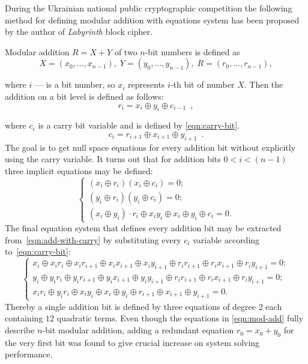 During the Ukrainian national public cryptographic competition the following
method for defining modular addition with equations system has been proposed 
by the author of \textit{Labyrinth} block cipher.

Modular addition $R = X + Y$ of two $n$-bit numbers is defined as 
\begin{equation}
\label{eqn:add}
X = (x_0, \hdots, x_{n-1}), \; 
Y = (y_0, \hdots, y_{n-1}), \;
R = (r_0, \hdots, r_{n-1}),
\end{equation}

where $i$ --- is a bit number, so $x_i$ represents $i$-th bit of number $X$. 
Then the addition on a bit level is defined as follows:
\begin{equation}
\label{eqn:trivial-mod-add}
r_i = x_i \oplus y_i \oplus c_{i-1} \enspace,
\end{equation}

where $c_i$ is a carry bit variable and is defined by \eqref{eqn:carry-bit}.
\begin{equation}
\label{eqn:carry-bit}
c_i = r_{i+1} \oplus x_{i+1} \oplus y_{i+1} \enspace.
\end{equation}
The goal is to get null space equations for every addition bit without
explicitly using the carry variable. It turns out that for addition bits 
$0 < i < (n - 1)$ three implicit equations may be defined:
\begin{equation}
\label{eqn:add-with-carry}
\left\{
	\begin{array}{ll}
        (x_i \oplus r_i) (x_i \oplus c_i) = 0; \\
        (y_i \oplus r_i) (y_i \oplus c_i) = 0; \\
        (x_i \oplus y_i) \cdot r_i \oplus x_i y_i \oplus x_i \oplus y_i \oplus c_i = 0.
	\end{array} \right.
\end{equation}
The final equation system that defines every addition bit may be extracted
from~\eqref{eqn:add-with-carry} by substituting every $c_i$ variable according
to~\ref{eqn:carry-bit}:
\begin{equation}
\label{eqn:mod-add}
\left\{
	\begin{array}{ll}
        x_i \oplus x_i r_i \oplus x_i r_{i+1} \oplus x_i x_{i+1} \oplus x_i y_{i+1} \oplus r_i r_{i+1} \oplus r_i x_{i+1} \oplus r_i y_{i+1} = 0; \\
        y_i \oplus y_i r_i \oplus y_i r_{i+1} \oplus y_i x_{i+1} \oplus y_i y_{i+1} \oplus r_i r_{i+1} \oplus r_i x_{i+1} \oplus r_i y_{i+1} = 0; \\
        x_i r_i \oplus y_i r_i \oplus x_i y_i \oplus x_i \oplus y_i \oplus r_{i+1} \oplus x_{i+1} \oplus y_{i+1} = 0.
	\end{array} \right.
\end{equation}
Thereby a single addition bit is defined by three equations of degree 2 each
containing $12$ quadratic terms. Even though the equations in
\eqref{eqn:mod-add} fully describe $n$-bit modular addition, adding a
redundant equation $r_0 = x_0 + y_0$ for the very first bit was found to give
crucial increase on system solving performance.


